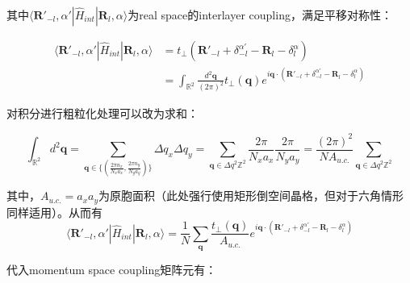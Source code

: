 \documentclass[hyperref,a4paper,UTF8]{ctexart}
\begin{document}
其中$\langle \mathbf{R}'_{-l}, \alpha' |\hat{H}_{int} | \mathbf{R}_l, \alpha \rangle$为real space的interlayer coupling，满足平移对称性：

$$\begin{aligned} \langle \mathbf{R}'_{-l}, \alpha' |\hat{H}_{int} | \mathbf{R}_l, \alpha \rangle & = t_{\perp} (\mathbf{R}'_{-l} + \delta^{\alpha'}_{-l} - \mathbf{R}_l - \delta^{\alpha}_{l} ) \\ & = \int_{\mathbb{R}^2} \frac{d^2 \mathbf{q}}{(2\pi)^2} t_\perp (\mathbf{q}) e^{i \mathbf{q} \cdot ( \mathbf{R}'_{-l} + \delta^{\alpha'}_{-l} - \mathbf{R}_l - \delta^{\alpha}_{l} )} \end{aligned}$$

对积分进行粗粒化处理可以改为求和：

$$\int_{\mathbb{R}^2} d^2 \mathbf{q} = \sum_{\mathbf{q} \in \{( \frac{2\pi n_x}{N_x a_x}, \frac{2\pi n_y}{N_y a_y} )\}} \Delta q_x \Delta q_y = \sum_{\mathbf{q} \in \Delta q^2 \mathbb{Z}^2} \frac{2\pi}{N_x a_x} \frac{2\pi}{N_y a_y} = \frac{(2\pi)^2}{N A_{u.c.}} \sum_{\mathbf{q} \in \Delta q^2 \mathbb{Z}^2}$$

其中，$A_{u.c.} = a_x a_y$为原胞面积（此处强行使用矩形倒空间晶格，但对于六角情形同样适用）。从而有
$$\langle \mathbf{R}'_{-l}, \alpha' |\hat{H}_{int} | \mathbf{R}_l, \alpha \rangle = \frac{1}{N} \sum_{\mathbf{q}} \frac{t_\perp (\mathbf{q})}{A_{u.c.}} e^{i \mathbf{q} \cdot ( \mathbf{R}'_{-l} + \delta^{\alpha'}_{-l} - \mathbf{R}_l - \delta^{\alpha}_{l} )}$$

代入momentum space coupling矩阵元有：
\end{document}
